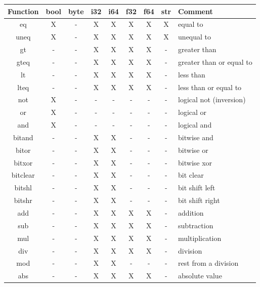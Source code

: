 \documentclass[11pt,fleqn,openany]{book} %
\begin{document}
\begin{center}
    \begin{tabular}{|c|c|c|c|c|c|c|c| m{8cm} |}
        \hline
        \textbf{Function} & \textbf{bool} & \textbf{byte} & \textbf{i32} & \textbf{i64} & \textbf{f32} & \textbf{f64} & \textbf{str} & \textbf{Comment} \\
        \hline
        eq        & X & - & X & X & X & X & X & equal to \\
        uneq      & X & - & X & X & X & X & X & unequal to \\
        gt        & - & - & X & X & X & X & - & greater than \\
        gteq      & - & - & X & X & X & X & - & greater than or equal to \\
        lt        & - & - & X & X & X & X & - & less than \\
        lteq      & - & - & X & X & X & X & - & less than or equal to \\
        \hline
        not       & X & - & - & - & - & - & - & logical not (inversion) \\
        or        & X & - & - & - & - & - & - & logical or \\
        and       & X & - & - & - & - & - & - & logical and \\
        \hline
        bitand    & - & - & X & X & - & - & - & bitwise and \\
        bitor     & - & - & X & X & - & - & - & bitwise or \\
        bitxor    & - & - & X & X & - & - & - & bitwise xor \\
        bitclear  & - & - & X & X & - & - & - & bit clear \\
        bitshl    & - & - & X & X & - & - & - & bit shift left \\
        bitshr    & - & - & X & X & - & - & - & bit shift right \\
        \hline
        add       & - & - & X & X & X & X & - & addition \\
        sub       & - & - & X & X & X & X & - & subtraction \\
        mul       & - & - & X & X & X & X & - & multiplication \\
        div       & - & - & X & X & X & X & - & division \\
        mod       & - & - & X & X & - & - & - & rest from a division \\
        abs       & - & - & X & X & X & X & - & absolute value\\

\end{tabular}
\end{center}
\end{document}
